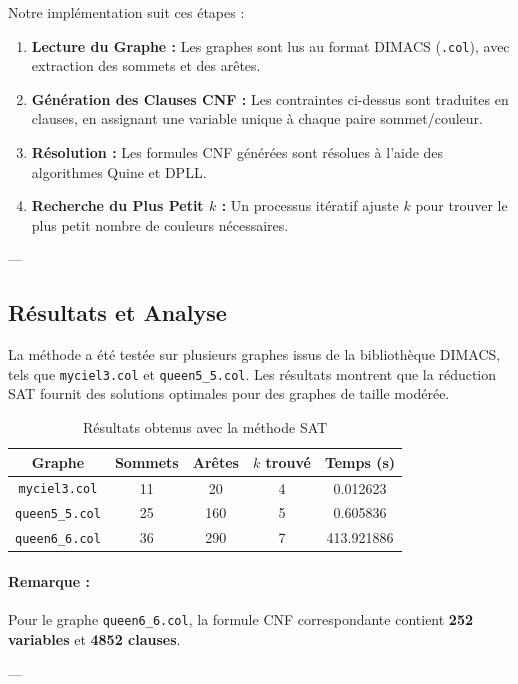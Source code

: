 \documentclass[11pt]{article}
\begin{document}
Notre implémentation suit ces étapes :
\begin{enumerate}
    \item \textbf{Lecture du Graphe :} Les graphes sont lus au format DIMACS (\texttt{.col}), avec extraction des sommets et des arêtes.
    \item \textbf{Génération des Clauses CNF :} Les contraintes ci-dessus sont traduites en clauses, en assignant une variable unique à chaque paire sommet/couleur.
    \item \textbf{Résolution :} Les formules CNF générées sont résolues à l'aide des algorithmes Quine et DPLL.
    \item \textbf{Recherche du Plus Petit \(k\) :} Un processus itératif ajuste \(k\) pour trouver le plus petit nombre de couleurs nécessaires.
\end{enumerate}

---

\subsection{Résultats et Analyse}

La méthode a été testée sur plusieurs graphes issus de la bibliothèque DIMACS, tels que \texttt{myciel3.col} et \texttt{queen5\_5.col}. Les résultats montrent que la réduction SAT fournit des solutions optimales pour des graphes de taille modérée.

\begin{table}[h!]
\centering
\begin{tabular}{|c|c|c|c|c|}
\hline
\textbf{Graphe} & \textbf{Sommets} & \textbf{Arêtes} & \textbf{\(k\) trouvé} & \textbf{Temps (s)} \\ \hline
\texttt{myciel3.col} & 11 & 20 & 4 & 0.012623 \\
\texttt{queen5\_5.col} & 25 & 160 & 5 & 0.605836 \\
\texttt{queen6\_6.col} & 36 & 290 & 7 & 413.921886 \\
\hline
\end{tabular}
\caption{Résultats obtenus avec la méthode SAT}
\label{tab:sat_results}
\end{table}
\paragraph{Remarque :} Pour le graphe \texttt{queen6\_6.col}, la formule CNF correspondante contient \textbf{252 variables} et \textbf{4852 clauses}.

---
\end{document}
